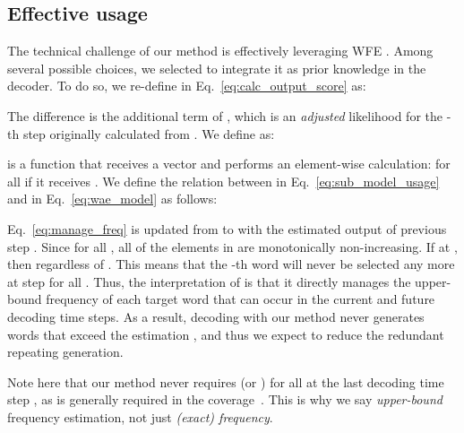 \documentclass[11pt]{article}
\begin{document}
   
\subsection{Effective usage}
The technical challenge of our method is effectively leveraging WFE . 
Among several possible choices, we selected to integrate it as prior knowledge in the decoder.
To do so, we re-define  in Eq.~\ref{eq:calc_output_score} as:

The difference is the additional term of ,
   which is an {\it adjusted} likelihood for the -th step originally calculated from .
We define  as: 

 is a function that receives a vector and performs an element-wise calculation:
 for all  if it receives .
We define the relation between  in Eq.~\ref{eq:sub_model_usage} and  in Eq.~\ref{eq:wae_model} as follows:

Eq.~\ref{eq:manage_freq} is updated from  to  with the estimated output of previous step .
Since  for all ,
   all of the elements in  are monotonically non-increasing. 
If  at , then  regardless of .
This means that the -th word will never be selected any more at step  for all .
Thus, the interpretation of  is that it directly manages the upper-bound frequency of each target word that can occur in the current and future decoding time steps.
As a result, decoding with our method never generates words that exceed the estimation , and thus we expect to reduce the redundant repeating generation.



   Note here that our method never requires  (or ) for all  at the last decoding time step , as is generally required in the coverage~\cite{tu-EtAl:2016:P16-1,mi-EtAl:2016:EMNLP2016,DBLP:journals/corr/WuSCLNMKCGMKSJL16}.
This is why we say {\it upper-bound} frequency estimation, not just {\it (exact) frequency}.
\end{document}
